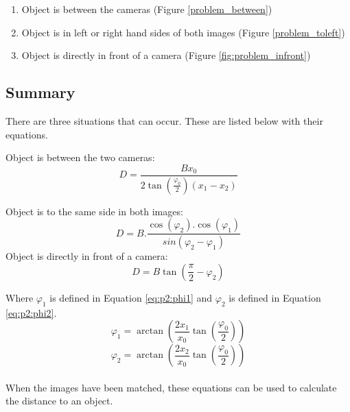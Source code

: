 \begin{enumerate}
\item Object is between the cameras (Figure \ref{problem_between})
\item Object is in left or right hand sides of both images (Figure \ref{problem_toleft})
\item Object is directly in front of a camera (Figure \ref{fig:problem_infront})
\end{enumerate}


\subsection{Summary}
There are three situations that can occur. These are listed below with their equations.

Object is between the two cameras:
\begin{equation} \label{eq:summary:1}
D = \frac{Bx_0}{2\tan(\frac{\varphi_0}{2})(x_1 - x_2)}
\end{equation}

Object is to the same side in both images:
\begin{equation} \label{eq:summary:2}
D = B.\frac{\cos(\varphi_2).\cos(\varphi_1)}{sin(\varphi_2 - \varphi_1)}
\end{equation}
Object is directly in front of a camera:
\begin{equation} \label{eq:summary:3}
D = B \tan\left(\frac{\pi}{2} - \varphi_{2}\right)
\end{equation}

Where $\varphi_1$ is defined in Equation \eqref{eq:p2:phi1} and $\varphi_2$ is defined in Equation \eqref{eq:p2:phi2}.
\begin{equation} \label{eq:p2:phi1}
\varphi_1 = \arctan\left(\frac{2x_1}{x_0}\tan\left(\frac{\varphi_0}{2}\right)\right)
\end{equation}
\begin{equation} \label{eq:p2:phi2}
\varphi_2 = \arctan\left(\frac{2x_2}{x_0}\tan\left(\frac{\varphi_0}{2}\right)\right)
\end{equation}
\\
When the images have been matched, these equations can be used to calculate the distance to an object.

